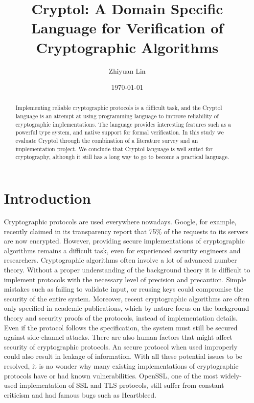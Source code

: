\documentclass[a4paper, notitlepage]{report}
\title{Cryptol: A Domain Specific Language for  Verification of Cryptographic Algorithms}
\author{Zhiyuan Lin}
\date{\today}
\begin{document}
\maketitle
\begin{abstract}

  Implementing reliable cryptographic protocols is a difficult task, and
  the Cryptol language is an attempt at using programming language to
  improve reliability of cryptographic implementations. The language
  provides interesting features such as a powerful type system, and
  native support for formal verification. In this study we evaluate
  Cryptol through the combination of a literature survey and an implementation
  project. We conclude that Cryptol language is well suited for
  cryptography, although it still has a long way to go to become a practical
  language. 
  
\end{abstract}

\newpage

\tableofcontents

\newpage


\chapter{Introduction}

Cryptographic protocols are used everywhere nowadays. Google, for example,
recently claimed in its transparency report that 75\% of the requests to
its servers are now encrypted.
However, providing secure implementations of cryptographic algorithms
remains a difficult task, even for experienced security engineers and
researchers.
Cryptographic algorithms often involve a lot of advanced number theory.
Without a proper understanding of the background theory it is difficult to implement
protocols with the necessary level of precision and precaution.
Simple mistakes such as failing to validate input, or reusing keys could
compromise the security of the entire system.
Moreover, recent cryptographic algorithms are often only specified in
academic publications, which by nature focus on the background theory and security
proofs of the protocols, instead of implementation details.
Even if the protocol follows the specification, the system must still be secured
against side-channel attacks.
There are also human factors that might affect security of cryptographic protocols.
An secure protocol when used improperly could also result in leakage of information.
With all these potential issues to be resolved, it is no wonder why
many existing implementations of cryptographic protocols have or had known
vulnerabilities.
OpenSSL, one of the most widely-used implementation of SSL and
TLS protocols, still suffer from constant criticism and had famous bugs such as
Heartbleed.
\end{document}
